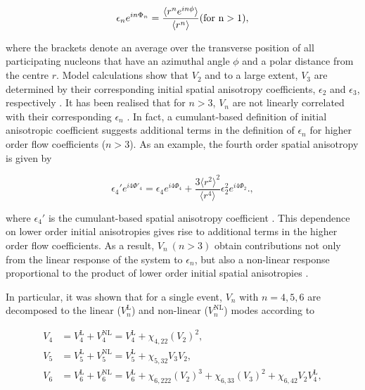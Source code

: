 \begin{equation}
\epsilon_{n}e^{in\Phi_n} = \frac{\langle{r^{n}e^{in\phi}}\rangle}{\langle r^n\rangle}  (\rm{for}~n>1),
\label{Eq:epsilonn}
\end{equation}

where the brackets denote an average over the transverse position of all participating nucleons that have an azimuthal angle $\phi$ and a polar distance from the centre $r$. Model calculations show that $V_2$ and to a large extent, $V_3$ are determined by their corresponding initial spatial anisotropy coefficients, $\epsilon_{2}$ and $\epsilon_{3}$, respectively \cite{Alver:2010gr}. It has been realised that for $n>3$, $V_n$ are not linearly correlated with their corresponding $\epsilon_{n}$ \cite{Bhalerao:2014xra,Alver:2010dn}.
In fact, a cumulant-based definition of initial anisotropic coefficient suggests additional terms in the definition of $\epsilon_{n}$ for higher order flow coefficients ($n>3$). As an example, the fourth order spatial anisotropy is given by 
 
\begin{equation}
\epsilon_{4}'e^{i4\Phi'_4} = \epsilon_{4}e^{i4\Phi_4}  + \frac{3\langle{r^{2}}\rangle^{2}}{\langle r^4\rangle}\epsilon_{2}^{2}e^{i4\Phi_2}.,
\label{Eq:epsilonnprime}
\end{equation}

where $\epsilon_{4}'$ is the cumulant-based spatial anisotropy coefficient \cite{Teaney:2013dta,Qian:2017ier}. This dependence on lower order initial anisotropies gives rise to additional terms in the higher order flow coefficients. As a result, $V_n~(n > 3)$ obtain contributions not only from the linear response of the system to $\epsilon_{n}$, but also a non-linear response proportional to the product of lower order initial spatial anisotropies \cite{Bhalerao:2014xra,Yan:2015jma}. 

In particular, it was shown that for a single event, $V_n$ with $n=4,5,6$ are decomposed to the linear ($V_{n}^{\mathrm{L}} $) and non-linear ($ V_{n}^{\mathrm{NL}}$) modes according to%

\vspace{-0.55cm}
\begin{align}
V_{4} &= V_{4}^{\mathrm{L}} + V_{4}^{\mathrm{NL}} = V_{4}^{\mathrm{L}} + \chi_{4,22}(V_{2})^2, \nonumber \\
V_{5} &= V_{5}^{\mathrm{L}} + V_{5}^{\mathrm{NL}} = V_{5}^{\mathrm{L}} + \chi_{5,32}V_{3}V_{2}, \nonumber \\
V_{6} &= V_{6}^{\mathrm{L}} + V_{6}^{\mathrm{NL}} = V_{6}^{\mathrm{L}} + \chi_{6,222}(V_{2})^3 + \chi_{6,33}(V_{3})^2 + \chi_{6,42}V_{2}V_{4}^{\mathrm{L}},
\label{Eq:V4V5V6}
\end{align}
\vspace{-0.55cm}

